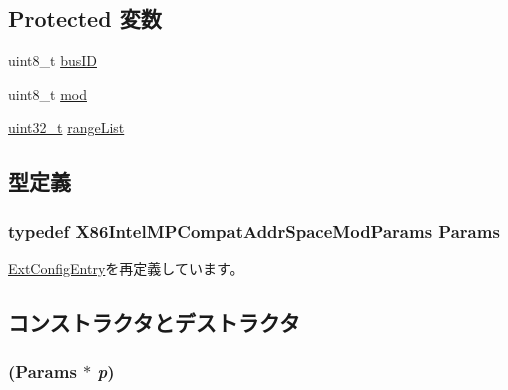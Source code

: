 \subsection*{Protected 変数}
\begin{DoxyCompactItemize}
\item 
uint8\_\-t \hyperlink{classX86ISA_1_1IntelMP_1_1CompatAddrSpaceMod_ac86b1934f811ad40b20b27d29c52a5d3}{busID}
\item 
uint8\_\-t \hyperlink{classX86ISA_1_1IntelMP_1_1CompatAddrSpaceMod_a7e6d6c4ffa3ecb61cde728e16c91deee}{mod}
\item 
\hyperlink{Type_8hh_a435d1572bf3f880d55459d9805097f62}{uint32\_\-t} \hyperlink{classX86ISA_1_1IntelMP_1_1CompatAddrSpaceMod_adefdce6f0c37ed6402c8283d6d4093e1}{rangeList}
\end{DoxyCompactItemize}


\subsection{型定義}
\hypertarget{classX86ISA_1_1IntelMP_1_1CompatAddrSpaceMod_a5f6d926d4afade776b21c22d1811adf8}{
\subsubsection[{Params}]{\setlength{\rightskip}{0pt plus 5cm}typedef X86IntelMPCompatAddrSpaceModParams {\bf Params}}}
\label{classX86ISA_1_1IntelMP_1_1CompatAddrSpaceMod_a5f6d926d4afade776b21c22d1811adf8}


\hyperlink{classX86ISA_1_1IntelMP_1_1ExtConfigEntry_ac05617332b889b2a33387663c048f2a9}{ExtConfigEntry}を再定義しています。

\subsection{コンストラクタとデストラクタ}
\hypertarget{classX86ISA_1_1IntelMP_1_1CompatAddrSpaceMod_af087ea2f82b87e5ceb0ffdf54a2acc41}{
\subsubsection[{CompatAddrSpaceMod}]{ ({\bf Params} $\ast$ {\em p})}}
\label{classX86ISA_1_1IntelMP_1_1CompatAddrSpaceMod_af087ea2f82b87e5ceb0ffdf54a2acc41}



